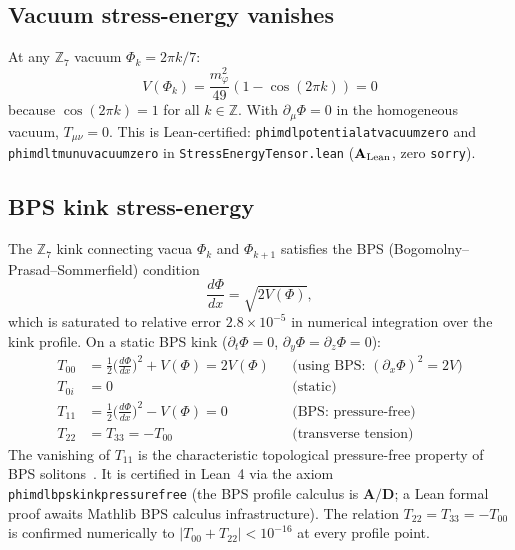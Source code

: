 \documentclass[11pt]{article}
\theoremstyle{remark}
\newcommand{\ZS}{\mathbb{Z}_7}
\newcommand{\ZZ}{\mathbb{Z}}
\newcommand{\lean}[1]{%
  \penalty-100
  \begingroup\def\_{\textunderscore\allowbreak}\texttt{#1}\endgroup}
\newcommand{\CatAL}{\ensuremath{\textbf{A}_{\rm Lean}}}
\newcommand{\CatAD}{\textbf{A/D}}
\newcommand{\Tmunu}{T_{\mu\nu}}
\begin{document}
\subsection{Vacuum stress-energy vanishes}

At any $\ZS$ vacuum $\Phi_k = 2\pi k/7$:
\begin{equation}
  V(\Phi_k) = \frac{m_\varphi^2}{49}(1 - \cos(2\pi k)) = 0
\label{eq:vacuum_V_zero}
\end{equation}
because $\cos(2\pi k) = 1$ for all $k\in\ZZ$.
With $\partial_\mu\Phi = 0$ in the homogeneous vacuum, $\Tmunu = 0$.
This is Lean-certified:
\lean{phimdl\_potential\_at\_vacuum\_zero} and \lean{phimdl\_tmunu\_vacuum\_zero}
in \lean{StressEnergyTensor.lean} ($\CatAL$, zero \texttt{sorry}).

\subsection{BPS kink stress-energy}
\label{ssec:bps_tmunu}

The $\ZS$ kink connecting vacua $\Phi_k$ and $\Phi_{k+1}$ satisfies the BPS
(Bogomolny--Prasad--Sommerfield) condition
\begin{equation}
  \frac{d\Phi}{dx} = \sqrt{2V(\Phi)},
\label{eq:bps}
\end{equation}
which is saturated to relative error $2.8\times10^{-5}$ in numerical integration
over the kink profile.
On a static BPS kink ($\partial_t\Phi = 0$, $\partial_y\Phi = \partial_z\Phi = 0$):
\begin{align}
  T_{00} &= \tfrac{1}{2}\bigl(\tfrac{d\Phi}{dx}\bigr)^2 + V(\Phi) = 2V(\Phi)
  &&\text{(using BPS: $(\partial_x\Phi)^2 = 2V$)}
\label{eq:T00_BPS}\\
  T_{0i} &= 0
  &&\text{(static)}
\label{eq:T0i_BPS}\\
  T_{11} &= \tfrac{1}{2}\bigl(\tfrac{d\Phi}{dx}\bigr)^2 - V(\Phi) = 0
  &&\text{(BPS: pressure-free)}
\label{eq:T11_BPS}\\
  T_{22} &= T_{33} = -T_{00}
  &&\text{(transverse tension)}
\label{eq:T22_BPS}
\end{align}
The vanishing of $T_{11}$ is the characteristic topological pressure-free property of BPS
solitons~\cite{Rajaraman1982}.
It is certified in Lean~4 via the axiom \lean{phimdl\_bps\_kink\_pressure\_free}
(the BPS profile calculus is $\CatAD$; a Lean formal proof awaits Mathlib BPS calculus
infrastructure).
The relation $T_{22} = T_{33} = -T_{00}$ is confirmed numerically to
$|T_{00} + T_{22}| < 10^{-16}$ at every profile point.
\end{document}

